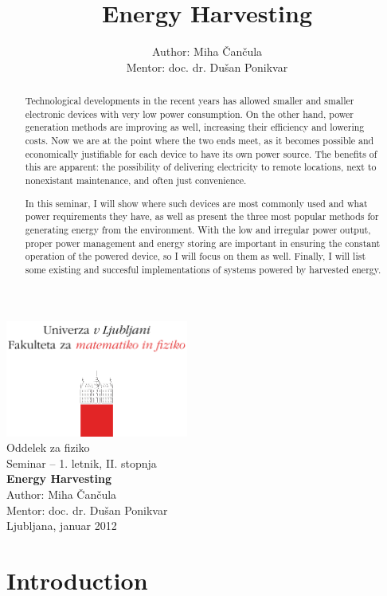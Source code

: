 \documentclass[a4paper,10pt]{article}
\title{Energy Harvesting}
\author{Author: Miha \v Can\v cula \\ Mentor: doc. dr. Du\v san Ponikvar}
\begin{document}
\begin{center}
\includegraphics[width=6cm]{../logo_fmf_uni-lj_sl}\\[0.5cm]
Oddelek za fiziko \\[2cm]
{ \large Seminar -- 1. letnik, II. stopnja } \\[1cm]
{ \huge \bf Energy Harvesting }\\[2cm]
{\large Author: Miha \v Can\v cula}\\[0.6cm]
{\large Mentor: doc. dr. Du\v san Ponikvar} \\[0.6cm]
{\large Ljubljana, januar 2012}
\end{center}
\vfill
\begin{abstract}

Technological developments in the recent years has allowed smaller and smaller electronic devices with very low power consumption. On the other hand, power generation methods are improving as well, increasing their efficiency and lowering costs. Now we are at the point where the two ends meet, as it becomes possible and economically justifiable for each device to have its own power source. The benefits of this are apparent: the possibility of delivering electricity to remote locations, next to nonexistant maintenance, and often just convenience. 

In this seminar, I will show where such devices are most commonly used and what power requirements they have, as well as present the three most popular methods for generating energy from the environment. With the low and irregular power output, proper power management and energy storing are important in ensuring the constant operation of the powered device, so I will focus on them as well. Finally, I will list some existing and succesful implementations of systems powered by harvested energy. 

\end{abstract}


\newpage
\tableofcontents

\newpage
\section{Introduction}
\end{document}
